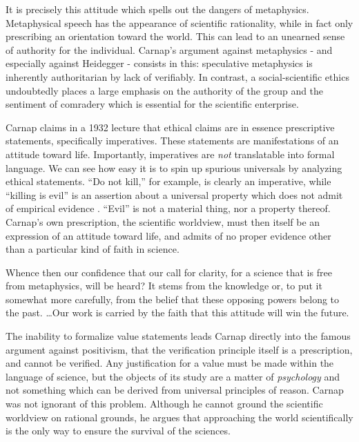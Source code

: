 \documentclass[leqno, 12pt]{turabian-researchpaper}
\begin{document}
	It is precisely this attitude which spells out the dangers of metaphysics.
	Metaphysical speech has the appearance of scientific rationality, while in fact
	only prescribing an orientation toward the world. This can lead to an unearned
	sense of authority for the individual. Carnap's argument against metaphysics -
	and especially against Heidegger - consists in this: speculative metaphysics
	is inherently authoritarian by lack of verifiably. In contrast, a social-scientific
	ethics undoubtedly places a large emphasis on the authority of the group and
	the sentiment of comradery which is essential for the scientific enterprise.

	Carnap claims in a 1932 lecture that ethical claims are in essence
	prescriptive statements, specifically imperatives. These statements are
	manifestations of an attitude toward life. Importantly, imperatives are \emph{not}
	translatable into formal language. We can see how easy it is to spin up
	spurious universals by analyzing ethical statements. \enquote{Do not kill,}
	for example, is clearly an imperative, while \enquote{killing is evil} is an assertion
	about a universal property which does not admit of empirical evidence \autocite[\S1.4]{carnap1996}.
	\enquote{Evil} is not a material thing, nor a property thereof. Carnap's own
	prescription, the scientific worldview, must then itself be an expression of
	an attitude toward life, and admits of no proper evidence other than a particular
	kind of faith in science.

	\begin{displayquote}
		 Whence then our confidence that our call for
		clarity, for a science that is free from metaphysics, will be heard? It
		stems from the knowledge or, to put it somewhat more carefully, from the
		belief that these opposing powers belong to the past. \dots Our work is carried
		by the faith that this attitude will win the future.
	\end{displayquote}

	The inability to formalize value statements leads Carnap directly into the
	famous argument against positivism, that the verification principle itself is a
	prescription, and cannot be verified. Any justification for a value must be made
	within the language of science, but the objects of its study are a matter of
	\emph{psychology} and not something which can be derived from universal principles
	of reason. Carnap was not ignorant of this problem. Although he cannot ground the
	scientific worldview on rational grounds, he argues that approaching the world
	scientifically is the only way to ensure the survival of the sciences.
\end{document}
